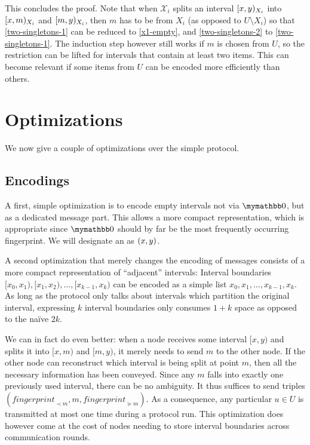 This concludes the proof. Note that when $\mathcal{X}_i$ splits an interval $[{x},{y})_{X_i}$ into $[{x},{m})_{X_i}$ and $[{m},{y})_{X_i}$, then $m$ has to be from $X_i$ (as opposed to $U \setminus X_i$) so that \cref{two-singletons-1} can be reduced to \cref{x1-empty}, and \cref{two-singletons-2} to \cref{two-singletons-1}. The induction step however still works if $m$ is chosen from $U$, so the restriction can be lifted for intervals that contain at least two items. This can become relevant if some items from $U$ can be encoded more efficiently than others.

\section{Optimizations}
\label{set-reconciliation-simple-optimizations}

We now give a couple of optimizations over the simple protocol.

\subsection{Encodings}

A first, simple optimization is to encode empty intervals not via $\neutraladd$, but as a dedicated message part. This allows a more compact representation, which is appropriate since $\neutraladd$ should by far be the most frequently occurring fingerprint. We will designate an  as $({x}, {y})$.

A second optimization that merely changes the encoding of messages consists of a more compact representation of ``adjacent'' intervals: Interval boundaries $[x_0, x_1), [x_1, x_2), \ldots, [x_{k - 1}, x_k)$ can be encoded as a simple list $x_0, x_1, \ldots, x_{k - 1}, x_k$. As long as the protocol only talks about intervals which partition the original interval, expressing $k$ interval boundaries only consumes $1 + k$ space as opposed to the naïve $2k$.

We can in fact do even better: when a node receives some interval $[x, y)$ and splits it into $[x, m)$ and $[m, y)$, it merely needs to send $m$ to the other node. If the other node can reconstruct which interval is being split at point $m$, then all the necessary information has been conveyed. Since any $m$ falls into exactly one previously used interval, there can be no ambiguity. It thus suffices to send triples $( \mathit{fingerprint}_{\prec m}, m, \mathit{fingerprint}_{\succeq m})$. As a consequence, any particular $u \in U$ is transmitted at most one time during a protocol run. This optimization does however come at the cost of nodes needing to store interval boundaries across communication rounds.

